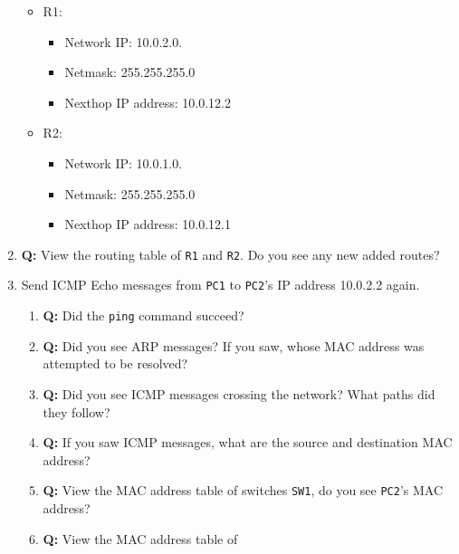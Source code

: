 \documentclass[pdftex,12pt,a4paper]{article}
\begin{document}
\begin{enumerate}
\begin{itemize}
                        \item R1: 
                            \begin{itemize}
                                \item Network IP: 10.0.2.0.
                                \item Netmask: 255.255.255.0
                                \item Nexthop IP address: 10.0.12.2
                            \end{itemize}
                        \item R2: 
                            \begin{itemize}
                                \item Network IP: 10.0.1.0.
                                \item Netmask: 255.255.255.0
                                \item Nexthop IP address: 10.0.12.1
                            \end{itemize}
                    \end{itemize}
                \item \textbf{Q:} View the routing table of \texttt{R1} and \texttt{R2}. Do
                    you see any new added routes?
                \item Send ICMP Echo messages from \texttt{PC1} to \texttt{PC2}'s IP address
                    10.0.2.2 again.
                    \begin{enumerate}
                        \item \textbf{Q:} Did the \texttt{ping} command succeed?
                        \item \textbf{Q:} Did you see ARP messages? If you saw, whose
                            MAC address was attempted to be resolved?
                        \item \textbf{Q:} Did you see ICMP messages crossing the
                            network? What paths did they follow?
                        \item \textbf{Q:} If you saw ICMP messages, what are
                            the source and destination MAC address?
                        \item \textbf{Q:} View the MAC address table of
                            switches \texttt{SW1}, do you see \texttt{PC2}'s MAC address?
                        \item \textbf{Q:} View the MAC address table of

\end{enumerate}
\end{enumerate}
\end{document}
